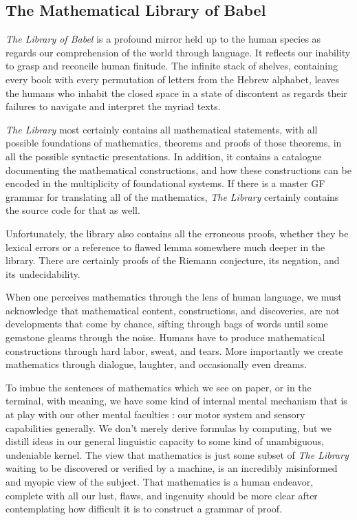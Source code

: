 \subsection{The Mathematical Library of Babel}

\emph{The Library of Babel} \cite{borges} is a profound mirror held up to the
human species as regards our comprehension of the world through language. It
reflects our inability to grasp and reconcile human finitude. The infinite stack
of shelves, containing every book with every permutation of letters from the
Hebrew alphabet, leaves the humans who inhabit the closed space in a state of
discontent as regards their failures to navigate and interpret the myriad texts.

\emph{The Library} most certainly contains all mathematical statements, with all
possible foundations of mathematics, theorems and proofs of those theorems, in
all the possible syntactic presentations. In addition, it contains a catalogue
documenting the mathematical constructions, and how these constructions can be
encoded in the multiplicity of foundational systems. If there is a master GF
grammar for translating all of the mathematics, \emph{The Library} certainly
contains the source code for that as well.

Unfortunately, the library also contains all the erroneous proofs, whether they
be lexical errors or a reference to flawed lemma somewhere much deeper in the
library. There are certainly proofs of the Riemann conjecture, its negation, and
its undecidability.

When one perceives mathematics through the lens of human language, we must
acknowledge that mathematical content, constructions, and discoveries, are not
developments that come by chance, sifting through bags of words until
some gemstone gleams through the noise. Humans have to produce mathematical
constructions through hard labor, sweat, and tears. More importantly we create
mathematics through dialogue, laughter, and occasionally even dreams.

To imbue the sentences of mathematics which we see on paper, or in the terminal,
with meaning, we have some kind of internal mental mechanism that is at play
with our other mental faculties : our motor system and sensory capabilities
generally. We don't merely derive formulas by computing, but we distill ideas in
our general linguistic capacity to some kind of unambiguous, undeniable kernel.
The view that mathematics is just some subset of \emph{The Library} waiting
to be discovered or verified by a machine, is an incredibly misinformed and
myopic view of the subject. That mathematics is a human endeavor, complete with
all our lust, flaws, and ingenuity should be more clear after contemplating how
difficult it is to construct a grammar of proof.
